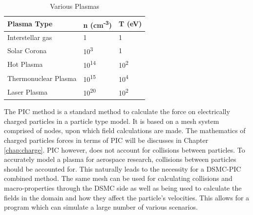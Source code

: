 \begin{table}
\label{tab:plasma}
\caption{Various Plasmas\cite{plasma_table}}
\vspace{0.3cm}
\begin{center}
\begin{tabular}{|lll|}
\hline
Plasma Type          & n (cm\textsuperscript{-3}) & T (eV)                  \\ \hline
Interstellar gas     & 1                        & 1                     \\
Solar Corona         & 10\textsuperscript{3}    & 1                     \\
Hot Plasma           & 10\textsuperscript{14}   & 10\textsuperscript{2} \\
Thermonuclear Plasma & 10\textsuperscript{15}   & 10\textsuperscript{4} \\
Laser Plasma         & 10\textsuperscript{20}   & 10\textsuperscript{2} \\ \hline
\end{tabular}
\end{center}
\end{table}

\indent The PIC method is a standard method to calculate the force on electrically charged particles in a particle type model. It is based on a mesh system comprised of nodes, upon which field calculations are made. The mathematics of charged particles forces in terms of PIC will be discusses in Chapter \ref{chap:charge}. PIC however, does not account for collisions between particles. To accurately model a plasma for aerospace research, collisions between particles should be accounted for. This naturally leads to the necessity for a DSMC-PIC combined method. The same mesh can be used for calculating collisions and macro-properties through the DSMC side as well as being used to calculate the fields in the domain and how they affect the particle's velocities. This allows for a program which can simulate a large number of various scenarios. \par


